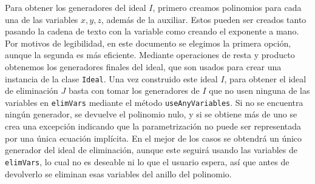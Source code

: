 Para obtener los generadores del ideal $I$, primero creamos polinomios para cada una de las variables $x,y,z$, además de la auxiliar. Estos pueden ser creados tanto pasando la cadena de texto con la variable como creando el exponente a mano. Por motivos de legibilidad, en este documento se elegimos la primera opción, aunque la segunda es más eficiente. Mediante operaciones de resta y producto obtenemos los generadores finales del ideal, que son usados para crear una instancia de la clase \texttt{Ideal}. Una vez construido este ideal $I$, para obtener el ideal de eliminación $J$ basta con tomar los generadores de $I$ que no usen ninguna de las variables en \texttt{elimVars} mediante el método \texttt{useAnyVariables}. Si no se encuentra ningún generador, se devuelve el polinomio nulo, y si se obtiene más de uno se crea una excepción indicando que la parametrización no puede ser representada por una única ecuación implícita. En el mejor de los casos se obtendrá un único generador del ideal de eliminación, aunque este seguirá usando las variables de \texttt{elimVars}, lo cual no es deseable ni lo que el usuario espera, así que antes de devolverlo se eliminan esas variables del anillo del polinomio.\newline

